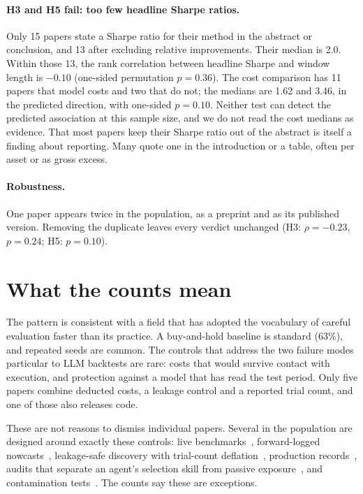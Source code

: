 \documentclass[11pt]{article}
\begin{document}
\paragraph{H3 and H5 fail: too few headline Sharpe ratios.} Only 15 papers
state a Sharpe ratio for their method in the abstract or conclusion, and 13
after excluding relative improvements. Their median is 2.0. Within those 13,
the rank correlation between headline Sharpe and window length is $-0.10$
(one-sided permutation $p=0.36$). The cost comparison has 11 papers that model
costs and two that do not; the medians are 1.62 and 3.46, in the predicted
direction, with one-sided $p=0.10$. Neither test can detect the predicted
association at this sample size, and we do not read the cost medians as
evidence. That most papers keep their Sharpe ratio out of the abstract is
itself a finding about reporting. Many quote one in the introduction or a
table, often per asset or as gross excess.

\paragraph{Robustness.} One paper appears twice in the population, as a
preprint and as its published version. Removing the duplicate leaves every
verdict unchanged (H3: $\rho=-0.23$, $p=0.24$; H5: $p=0.10$).

\section{What the counts mean}

The pattern is consistent with a field that has adopted the vocabulary of
careful evaluation faster than its practice. A buy-and-hold baseline is
standard (63\%), and repeated seeds are common. The controls that address the
two failure modes particular to LLM backtests are rare: costs that would
survive contact with execution, and protection against a model that has read
the test period. Only five papers combine deducted costs, a leakage control and
a reported trial count, and one of those also releases code.

These are not reasons to dismiss individual papers. Several in the population
are designed around exactly these controls: live
benchmarks~\cite{li2025timetravel}, forward-logged
nowcasts~\cite{chen2026nowcasting}, leakage-safe discovery with trial-count
deflation~\cite{gencay2026honest}, production
records~\cite{barton2026production}, audits that separate an agent's selection
skill from passive exposure~\cite{chen2026audit}, and contamination
tests~\cite{gao2026lookahead}. The counts say these are exceptions.
\end{document}
